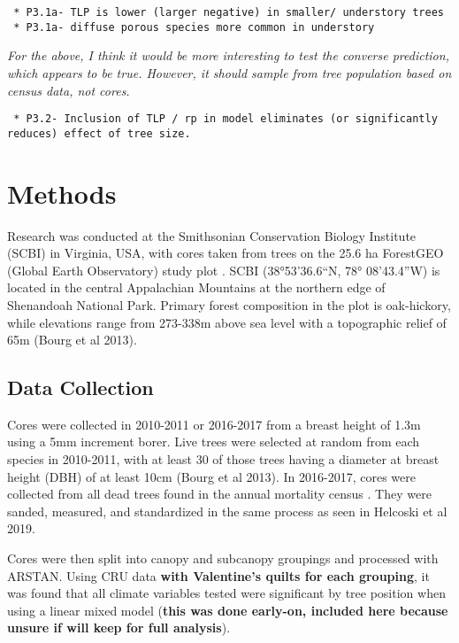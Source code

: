 \documentclass[]{book}
\begin{document}
\begin{verbatim}
 * P3.1a- TLP is lower (larger negative) in smaller/ understory trees
 * P3.1a- diffuse porous species more common in understory 
\end{verbatim}

\emph{For the above, I think it would be more interesting to test the converse prediction, which appears to be true. However, it should sample from tree population based on census data, not cores.}

\begin{verbatim}
 * P3.2- Inclusion of TLP / rp in model eliminates (or significantly reduces) effect of tree size.
\end{verbatim}

\hypertarget{methods}{%
\chapter{Methods}\label{methods}}

Research was conducted at the Smithsonian Conservation Biology Institute (SCBI) in Virginia, USA, with cores taken from trees on the 25.6 ha ForestGEO (Global Earth Observatory) study plot \citep{andersonteixeira_ctfs-forestgeo:_2015}. SCBI (38°53'36.6``N, 78° 08'43.4''W) \citep{gonzalezakre_patterns_2016} is located in the central Appalachian Mountains at the northern edge of Shenandoah National Park. Primary forest composition in the plot is oak-hickory, while elevations range from 273-338m above sea level \citep{gonzalezakre_patterns_2016} with a topographic relief of 65m (Bourg et al 2013).

\hypertarget{data-collection}{%
\section{Data Collection}\label{data-collection}}

Cores were collected in 2010-2011 or 2016-2017 from a breast height of 1.3m using a 5mm increment borer. Live trees were selected at random from each species in 2010-2011, with at least 30 of those trees having a diameter at breast height (DBH) of at least 10cm (Bourg et al 2013). In 2016-2017, cores were collected from all dead trees found in the annual mortality census \citep{gonzalezakre_patterns_2016}. They were sanded, measured, and standardized in the same process as seen in Helcoski et al 2019.

Cores were then split into canopy and subcanopy groupings and processed with ARSTAN. Using CRU data \textbf{with Valentine's quilts for each grouping}, it was found that all climate variables tested were significant by tree position when using a linear mixed model (\textbf{this was done early-on, included here because unsure if will keep for full analysis}).
\end{document}
